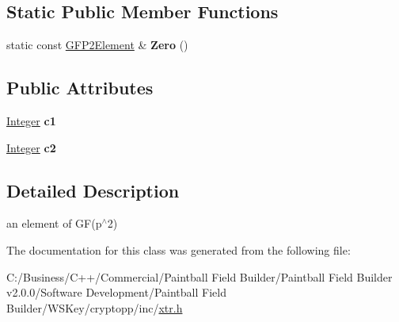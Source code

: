 \subsection*{Static Public Member Functions}
\begin{DoxyCompactItemize}
\item 
\hypertarget{class_g_f_p2_element_a082f138a73baf71713c27ace3f38d8e5}{
static const \hyperlink{class_g_f_p2_element}{GFP2Element} \& {\bfseries Zero} ()}
\label{class_g_f_p2_element_a082f138a73baf71713c27ace3f38d8e5}

\end{DoxyCompactItemize}
\subsection*{Public Attributes}
\begin{DoxyCompactItemize}
\item 
\hypertarget{class_g_f_p2_element_a65778354421ad2da42fce4221e6da05c}{
\hyperlink{class_integer}{Integer} {\bfseries c1}}
\label{class_g_f_p2_element_a65778354421ad2da42fce4221e6da05c}

\item 
\hypertarget{class_g_f_p2_element_a1688b28610e1b080a9304daad7c73bbb}{
\hyperlink{class_integer}{Integer} {\bfseries c2}}
\label{class_g_f_p2_element_a1688b28610e1b080a9304daad7c73bbb}

\end{DoxyCompactItemize}


\subsection{Detailed Description}
an element of GF(p$^\wedge$2) 

The documentation for this class was generated from the following file:\begin{DoxyCompactItemize}
\item 
C:/Business/C++/Commercial/Paintball Field Builder/Paintball Field Builder v2.0.0/Software Development/Paintball Field Builder/WSKey/cryptopp/inc/\hyperlink{xtr_8h}{xtr.h}\end{DoxyCompactItemize}
